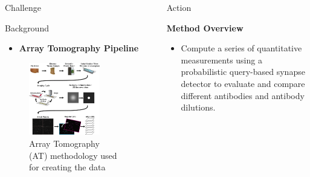\documentclass[final, table]{beamer}
\newlength{\sepwid}
\newlength{\onecolwid}
\newlength{\twocolwid}
\begin{document}
\begin{frame}[t]
\begin{columns}[t]
\begin{column}{\onecolwid}
\begin{block}{Challenge}
\end{block}

\begin{block}{Background} 

\begin{itemize} 
\item \textbf{Array Tomography Pipeline}
\end{itemize} 

\begin{figure}
\centering
\includegraphics[width=0.8\textwidth]{figs/at_diagram3}
\caption{Array Tomography (AT) methodology used for creating the data \cite{Weiler}}
\end{figure}




\end{block} 


\end{column}

\begin{column}{\sepwid}\end{column}  %
\begin{column}{\twocolwid}




\begin{block}{Action}

\textbf{Method Overview}

\begin{itemize} 
\item Compute a series of quantitative measurements using a probabilistic query-based synapse detector to evaluate and compare different antibodies and antibody dilutions.  
%
\end{itemize} 


\end{block}
\end{column}
\end{columns}
\end{frame}
\end{document}
